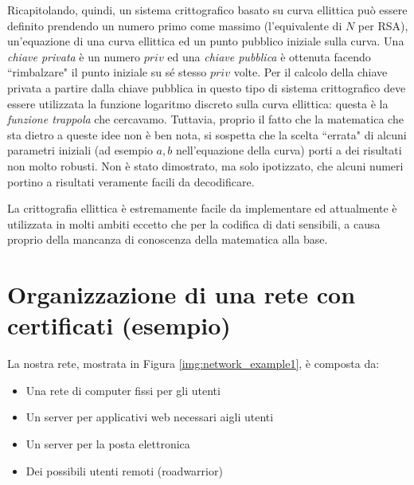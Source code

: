 Ricapitolando, quindi, un sistema crittografico basato su curva ellittica può essere definito prendendo un numero primo come massimo (l'equivalente di $N$ per RSA), un'equazione di una curva ellittica ed un punto pubblico iniziale sulla curva. Una \textit{chiave privata} è un numero $priv$ ed una \textit{chiave pubblica} è ottenuta facendo \textquotedblleft rimbalzare" il punto iniziale su sé stesso $priv$ volte. Per il calcolo della chiave privata a partire dalla chiave pubblica in questo tipo di sistema crittografico deve essere utilizzata la funzione logaritmo discreto sulla curva ellittica: questa è la \textit{funzione trappola} che cercavamo. Tuttavia, proprio il fatto che la matematica che sta dietro a queste idee non è ben nota, si sospetta che la scelta \textquotedblleft errata" di alcuni parametri iniziali (ad esempio $a, b$ nell'equazione della curva) porti a dei risultati non molto robusti. Non è stato dimostrato, ma solo ipotizzato, che alcuni numeri portino a risultati veramente facili da decodificare.

La crittografia ellittica è estremamente facile da implementare ed attualmente è utilizzata in molti ambiti eccetto che per la codifica di dati sensibili, a causa proprio della mancanza di conoscenza della matematica alla base.

\newpage
\section{Organizzazione di una rete con certificati (esempio)}
La nostra rete, mostrata in Figura \ref{img:network_example1}, è composta da:
\begin{itemize}
\item Una rete di computer fissi per gli utenti
\item Un server per applicativi web necessari aigli utenti
\item Un server per la posta elettronica
\item Dei possibili utenti remoti (roadwarrior)
\end{itemize}

